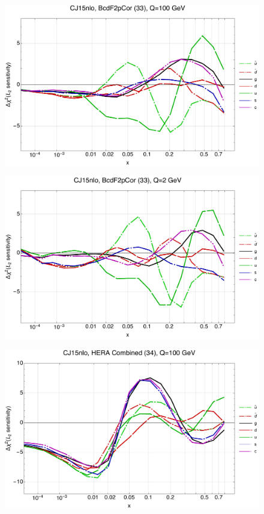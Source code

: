 \documentclass[10pt,aps,prd,floatfix,titlepage]{revtex4}
\begin{document}
\clearpage
\begin{figure}
\includegraphics[width=\textwidth,height=0.44\textheight,keepaspectratio]{1/33_CJ15nlo_L2_q100_Sf_1.pdf}
\caption{}
\end{figure}
\begin{figure}
\includegraphics[width=\textwidth,height=0.44\textheight,keepaspectratio]{1/33_CJ15nlo_L2_q2_Sf_1.pdf}
\caption{}
\end{figure}
\clearpage
\begin{figure}
\includegraphics[width=\textwidth,height=0.44\textheight,keepaspectratio]{1/34_CJ15nlo_L2_q100_Sf_1.pdf}
\caption{}
\end{figure}
\end{document}
